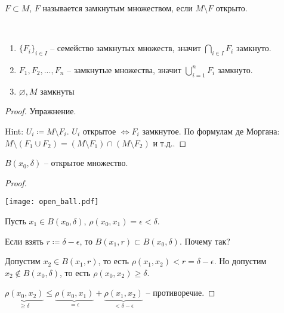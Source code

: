 \documentclass[main]{subfiles}
\begin{document}
\begin{definition}
    $F \subset M$, $F$ называется замкнутым множеством, если $M \setminus F$ открыто.
\end{definition}
\begin{theorem}
    \

    \begin{enumerate}
        \item $\{F_i\}_{i \in I}$ -- семейство замкнутых множеств, значит $\bigcap_{i \in I} F_i$ замкнуто.
        \item $F_1, F_2, ..., F_n$ -- замкнутые множества, значит $\bigcup_{i=1}^n F_i$ замкнуто.
        \item $\varnothing, M$ замкнуты
    \end{enumerate}
\end{theorem}
\begin{proof}
    Упражнение.

    Hint: $U_i \coloneqq M \setminus F_i$. $U_i$ открытое $\Leftrightarrow F_i$ замкнутое.
    По формулам де Моргана: $M \setminus (F_1 \cup F_2) = (M\setminus F_1) \cap (M \setminus F_2)$ и т.д..
\end{proof}

\begin{lemma}\label{spaces:1}
    $B(x_0, \delta)$ -- открытое множество.
\end{lemma}
\begin{proof}
    \

    \begin{minipage}{0.45\textwidth}
        \texttt{[image: open\_ball.pdf]}
    \end{minipage}
    \begin{minipage}{0.45\textwidth}\raggedright
        Пусть $x_1 \in B(x_0, \delta)$,  $\rho(x_0, x_1) = \epsilon < \delta$.

        Если взять $r \coloneqq \delta - \epsilon$, то $B(x_1, r) \subset B(x_0, \delta)$.
        Почему так?
    \end{minipage}

    Допустим $x_2 \in B(x_1, r)$, то есть $\rho(x_1, x_2) < r = \delta - \epsilon$.
    Но допустим $x_2 \not\in B(x_0, \delta)$, то есть $\rho(x_0, x_2) \ge \delta$.

    $\underbrace{\rho(x_0, x_2)}_{\ge \delta} \le \underbrace{\rho(x_0, x_1)}_{= \epsilon} + \underbrace{\rho(x_1, x_2)}_{< \delta- \epsilon}$ -- противоречие.
\end{proof}
\end{document}
